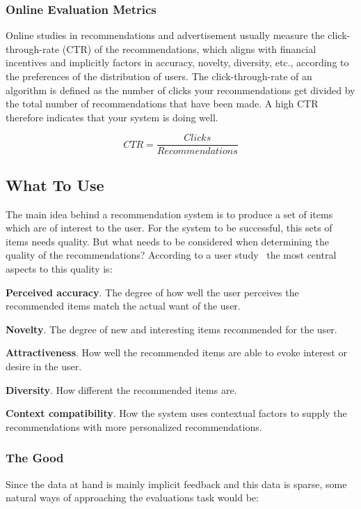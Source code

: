\subsubsection{Online Evaluation Metrics}

Online studies in recommendations and advertisement usually measure the
click-through-rate (CTR) of the recommendations, which aligns with financial
incentives and implicitly factors in accuracy, novelty, diversity, etc.,
according to the preferences of the distribution of users.  The
click-through-rate of an algorithm is defined as the number of clicks your
recommendations get divided by the total number of recommendations that have
been made. A high CTR therefore indicates that your system is doing well.

\begin{equation}
CTR = \frac{Clicks}{Recommendations}
\end{equation}

\subsection{What To Use}

The main idea behind a recommendation system is to produce a set of items which are of interest to the user.
For the system to be successful, this sets of items needs quality.
But what needs to be considered when determining the quality of the recommendations?
According to a user study~\cite{Pu:2011:UEF:2043932.2043962} the most central aspects to this quality is:


\textbf{Perceived accuracy}.
The degree of how well the user perceives the recommended items match the actual want of the user.

\textbf{Novelty}.
The degree of new and interesting items recommended for the user.

\textbf{Attractiveness}.
How well the recommended items are able to evoke interest or desire in the user.

\textbf{Diversity}.
How different the recommended items are.

\textbf{Context compatibility}.
How the system uses contextual factors to supply the recommendations with more personalized recommendations.


\subsubsection{The Good}
Since the data at hand is mainly implicit feedback and this data is sparse, some natural ways of approaching the evaluations task would be:

